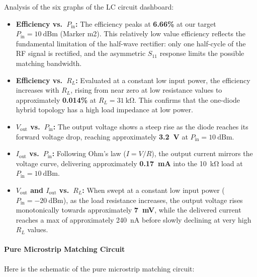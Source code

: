 Analysis of the six graphs of the LC circuit dashboard:
\begin{itemize}
    \item \textbf{Efficiency vs.\ $P_\mathrm{in}$:}
    The efficiency peaks at \textbf{6.66\%} at our target
    $P_\mathrm{in} = \SI{10}{\text{dBm}}$ (Marker m2).
    This relatively low value efficiency
    reflects the fundamental limitation of the half-wave rectifier:
    only one half-cycle of the RF signal is rectified, and the
    asymmetric $S_{11}$ response limits the possible matching
    bandwidth.

    \item \textbf{Efficiency vs.\ $R_L$:}
    Evaluated at a constant low input power, the efficiency increases
     with $R_L$, rising from near zero at low resistance
    values to approximately \textbf{0.014\%} at
    $R_L = \SI{31}{\kilo\ohm}$. This confirms that the one-diode
    hybrid topology has a high load impedance at low power.

    \item \textbf{$V_\mathrm{out}$ vs.\ $P_\mathrm{in}$:}
    The output voltage shows a steep rise as the diode
    reaches its forward voltage drop, reaching approximately
    \textbf{\SI{3.2}{\volt}} at $P_\mathrm{in} = \SI{10}{\text{dBm}}$.

    \item \textbf{$I_\mathrm{out}$ vs.\ $P_\mathrm{in}$:}
    Following Ohm's law ($I = V/R$), the output current mirrors the
    voltage curve, delivering approximately
    \textbf{\SI{0.17}{\milli\ampere}} into the \SI{10}{\kilo\ohm} load
    at $P_\mathrm{in} = \SI{10}{\text{dBm}}$.

    \item \textbf{$V_\mathrm{out}$ and $I_\mathrm{out}$ vs.\ $R_L$:}
    When swept at a constant low input power
    ($P_\mathrm{in} = -\SI{20}{\text{dBm}}$), as the load resistance
    increases, the output voltage rises monotonically towards
    approximately \textbf{\SI{7}{\milli\volt}}, while the delivered
    current reaches a max of approximately \SI{240}{\nano\ampere}
    before slowly declining at very high $R_L$ values.
\end{itemize}

\paragraph{Pure Microstrip Matching Circuit}

Here is the schematic of the pure microstrip matching circuit:


